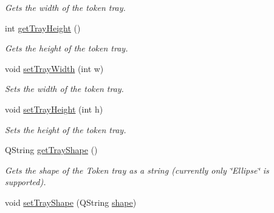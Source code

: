 \begin{DoxyCompactItemize}
\begin{DoxyCompactList}\small\item\em Gets the width of the token tray. \end{DoxyCompactList}\item 
\hypertarget{class_picto_1_1_token_tray_graphic_a4543d0302b442062c7789b668cc18a1e}{int \hyperlink{class_picto_1_1_token_tray_graphic_a4543d0302b442062c7789b668cc18a1e}{get\-Tray\-Height} ()}\label{class_picto_1_1_token_tray_graphic_a4543d0302b442062c7789b668cc18a1e}

\begin{DoxyCompactList}\small\item\em Gets the height of the token tray. \end{DoxyCompactList}\item 
\hypertarget{class_picto_1_1_token_tray_graphic_a88c521cecb1659f3e3ab0cd56ed8610a}{void \hyperlink{class_picto_1_1_token_tray_graphic_a88c521cecb1659f3e3ab0cd56ed8610a}{set\-Tray\-Width} (int w)}\label{class_picto_1_1_token_tray_graphic_a88c521cecb1659f3e3ab0cd56ed8610a}

\begin{DoxyCompactList}\small\item\em Sets the width of the token tray. \end{DoxyCompactList}\item 
\hypertarget{class_picto_1_1_token_tray_graphic_a7925690ef58c791b0e2c8fdc7d78df34}{void \hyperlink{class_picto_1_1_token_tray_graphic_a7925690ef58c791b0e2c8fdc7d78df34}{set\-Tray\-Height} (int h)}\label{class_picto_1_1_token_tray_graphic_a7925690ef58c791b0e2c8fdc7d78df34}

\begin{DoxyCompactList}\small\item\em Sets the height of the token tray. \end{DoxyCompactList}\item 
\hypertarget{class_picto_1_1_token_tray_graphic_affbd6df49fea727bf2331b92be06cc0b}{Q\-String \hyperlink{class_picto_1_1_token_tray_graphic_affbd6df49fea727bf2331b92be06cc0b}{get\-Tray\-Shape} ()}\label{class_picto_1_1_token_tray_graphic_affbd6df49fea727bf2331b92be06cc0b}

\begin{DoxyCompactList}\small\item\em Gets the shape of the Token tray as a string (currently only \char`\"{}\-Ellipse\char`\"{} is supported). \end{DoxyCompactList}\item 
\hypertarget{class_picto_1_1_token_tray_graphic_ab18ae0463126b26e85d29cce74b2d3e5}{void \hyperlink{class_picto_1_1_token_tray_graphic_ab18ae0463126b26e85d29cce74b2d3e5}{set\-Tray\-Shape} (Q\-String \hyperlink{class_picto_1_1_token_tray_graphic_a8635ae2a3b7939007fae31ea013ae06b}{shape})}\label{class_picto_1_1_token_tray_graphic_ab18ae0463126b26e85d29cce74b2d3e5}


\end{DoxyCompactItemize}
